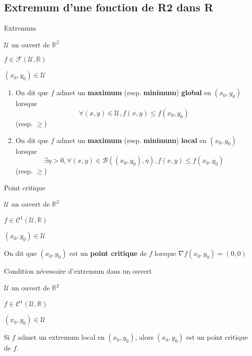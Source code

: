 \subsection{Extremum d’une fonction de R2 dans R}

    \begin{defi}{Extremum}{}
        \begin{soient}
            \item $\mathcal{U}$ un ouvert de $\mathbb{R}^2$
            \item $f\in \mathcal{F}(\mathcal{U},\mathbb{R})$
            \item $(x_0,y_0) \in \mathcal{U}$
        \end{soient}
        \begin{enumerate}
            \item On dit que $f$ admet un \textbf{maximum} (resp. \textbf{minimum}) \textbf{global} en $(x_0,y_0)$ lorsque 
            \[ \forall (x,y) \in \mathcal{U}, f(x,y) \leq f(x_0,y_0)\] 
            (resp. $\geq$)
            \item On dit que $f$ admet un \textbf{maximum} (resp. \textbf{minimum}) \textbf{local} en $(x_0,y_0)$ lorsque 
            \[ \exists \eta > 0, \forall (x,y) \in \mathcal{B}((x_0,y_0),\eta), f(x,y) \leq f(x_0,y_0) \]
            (resp. $\geq$)
        \end{enumerate}
    \end{defi}

    \begin{defi}{Point critique}{}
        \begin{soient}
            \item $\mathcal{U}$ un ouvert de $\mathbb{R}^2$
            \item $f\in \mathcal{C}^1(\mathcal{U},\mathbb{R})$
            \item $(x_0,y_0) \in \mathcal{U}$
        \end{soient}
        On dit que $(x_0,y_0)$ est un \textbf{point critique} de $f$ lorsque $\nabla f(x_0,y_0) = (0,0)$
    \end{defi}

    \begin{prop}{Condition nécessaire d’extremum dans un ouvert}{}
        \begin{soient}
            \item $\mathcal{U}$ un ouvert de $\mathbb{R}^2$
            \item $f\in \mathcal{C}^1(\mathcal{U},\mathbb{R})$
            \item $(x_0,y_0) \in \mathcal{U}$
        \end{soient}
        Si $f$ admet un extremum local en $(x_0,y_0)$, alors $(x_0,y_0)$ est un point critique de $f$.
    \end{prop}

